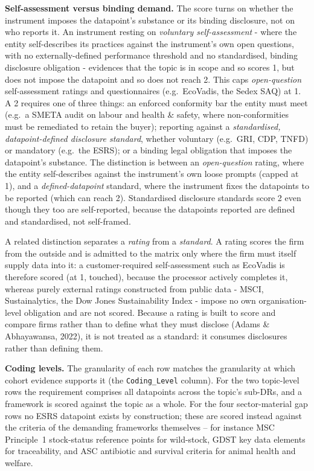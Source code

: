 \documentclass[
]{article}
\begin{document}
\textbf{Self-assessment versus binding demand.} The score turns on whether
the instrument imposes the datapoint's substance or its binding
disclosure, not on who reports it. An instrument resting on
\emph{voluntary self-assessment} - where the entity self-describes its
practices against the instrument's own open questions, with no
externally-defined performance threshold and no standardised, binding
disclosure obligation - evidences that the topic is in scope and so
scores 1, but does not impose the datapoint and so does not reach 2. This
caps \emph{open-question} self-assessment ratings and questionnaires
(e.g.\ EcoVadis, the Sedex SAQ) at 1. A 2 requires one of three things:
an enforced conformity bar the entity must meet (e.g.\ a SMETA audit on
labour and health \& safety, where non-conformities must be remediated to
retain the buyer); reporting against a \emph{standardised,
datapoint-defined disclosure standard}, whether voluntary (e.g.\ GRI,
CDP, TNFD) or mandatory (e.g.\ the ESRS); or a binding legal obligation
that imposes the datapoint's substance. The distinction is between an
\emph{open-question} rating, where the entity self-describes against the
instrument's own loose prompts (capped at 1), and a \emph{defined-datapoint}
standard, where the instrument fixes the datapoints to be reported (which
can reach 2). Standardised disclosure standards score 2 even though they
too are self-reported, because the datapoints reported are defined and
standardised, not self-framed.

A related distinction separates a \emph{rating} from a \emph{standard}. A
rating scores the firm from the outside and is admitted to the matrix only
where the firm must itself supply data into it: a customer-required
self-assessment such as EcoVadis is therefore scored (at 1, touched),
because the processor actively completes it, whereas purely external
ratings constructed from public data - MSCI, Sustainalytics, the Dow
Jones Sustainability Index - impose no own organisation-level obligation
and are not scored. Because a rating is built to score and compare firms
rather than to define what they must disclose (Adams \& Abhayawansa,
2022), it is not treated as a standard: it consumes disclosures rather
than defining them.

\textbf{Coding levels.} The granularity of each row matches the
granularity at which cohort evidence supports it (the \texttt{Coding\_Level}
column). For the two topic-level rows the requirement comprises all
datapoints across the topic's sub-DRs, and a framework is scored against
the topic as a whole. For the four sector-material gap rows no ESRS
datapoint exists by construction; these are scored instead against the
criteria of the demanding frameworks themselves -- for instance MSC
Principle~1 stock-status reference points for wild-stock, GDST key data
elements for traceability, and ASC antibiotic and survival criteria for
animal health and welfare.
\end{document}
